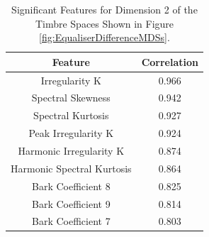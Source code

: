 	\begin{table}[h!]
		\centering
		\begin{tabular}{|c|c|}
			\hline
			\bf{Feature} & \bf{Correlation} \\
			\hline
			\hline
			Irregularity K & 0.966 \\
			\hline
			Spectral Skewness & 0.942 \\
			\hline
			Spectral Kurtosis & 0.927 \\
			\hline
			Peak Irregularity K & 0.924 \\
			\hline
			Harmonic Irregularity K & 0.874 \\
			\hline
			Harmonic Spectral Kurtosis & 0.864 \\
			\hline
			Bark Coefficient 8 & 0.825 \\
			\hline
			Bark Coefficient 9 & 0.814 \\
			\hline
			Bark Coefficient 7 & 0.803 \\
			\hline
		\end{tabular}
		\caption{Significant Features for Dimension 2 of the Timbre Spaces Shown in Figure 
			 \ref{fig:EqualiserDifferenceMDSs}.}
		\label{tab:EqualiserDifferenceFeatures}
	\end{table}
